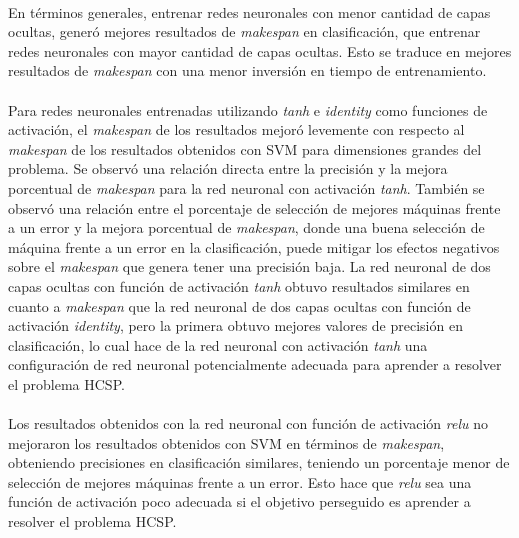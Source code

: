 \paragraph{} En términos generales, entrenar redes neuronales con menor cantidad de capas ocultas, generó mejores resultados de \textit{makespan} en clasificación, que entrenar redes neuronales con mayor cantidad de capas ocultas.
Esto se traduce en mejores resultados de \textit{makespan} con una menor inversión en tiempo de entrenamiento. 

\paragraph{} Para redes neuronales entrenadas utilizando \textit{tanh} e \textit{identity} como funciones de activación, el \textit{makespan} de los resultados mejoró levemente con respecto al \textit{makespan} de los resultados obtenidos con SVM para dimensiones grandes del problema.
Se observó una relación directa entre la precisión y la mejora porcentual de \textit{makespan} para la red neuronal con activación \textit{tanh}. También se observó una relación entre el porcentaje de selección de mejores máquinas frente a un error y la mejora porcentual de \textit{makespan}, donde una buena selección de máquina frente a un error en la clasificación, puede mitigar los efectos negativos sobre el \textit{makespan} que genera tener una precisión baja. La red neuronal de dos capas ocultas con función de activación \textit{tanh} obtuvo resultados similares en cuanto a \textit{makespan} que la red neuronal de dos capas ocultas con función de activación \textit{identity}, pero la primera obtuvo mejores valores de precisión en clasificación, lo cual hace de la red neuronal con activación \textit{tanh} una configuración de red neuronal potencialmente adecuada para aprender a resolver el problema HCSP.

\paragraph{} Los resultados obtenidos con la red neuronal con función de activación \textit{relu} no mejoraron los resultados obtenidos con SVM en términos de \textit{makespan}, obteniendo precisiones en clasificación similares, teniendo un porcentaje menor de selección de mejores máquinas frente a un error. Esto hace que \textit{relu} sea una función de activación poco adecuada si el objetivo perseguido es aprender a resolver el problema HCSP.